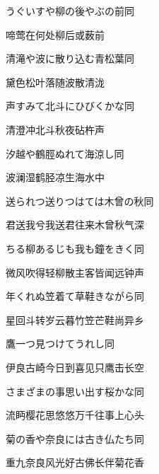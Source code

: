 \begin{haiku}
    {\FH うぐいすや柳の後やぶの前}\hfill{\FH 同}

    {\FK 啼莺在何处柳后或薮前}
\end{haiku}

\begin{haiku}
    {\FH 清滝や波に散り込む青松葉}\hfill{\FH 同}

    {\FK 黛色松叶落随波散清泷}
\end{haiku}

\begin{haiku}
    {\FH 声すみて北斗にひびくかな}\hfill{\FH 同}

    {\FK 清澄冲北斗秋夜砧杵声}
\end{haiku}

\begin{haiku}
    {\FH 汐越や鶴脛ぬれて海涼し}\hfill{\FH 同}

    {\FK 波澜湿鹤胫凉生海水中}
\end{haiku}

\begin{haiku}
    {\FH 送られつ送りつはては木曾の秋}\hfill{\FH 同}

    {\FK 君送我兮我送君往来木曾秋气深}
\end{haiku}

\begin{haiku}
    {\FH ちる柳あるじも我も鐘をきく}\hfill{\FH 同}

    {\FK 微风吹得轻柳散主客皆闻远钟声}
\end{haiku}

\begin{haiku}
    {\FH 年くれぬ笠着て草鞋きながら}\hfill{\FH 同}

    {\FK 星回斗转岁云暮竹笠芒鞋尚异乡}
\end{haiku}

\begin{haiku}
    {\FH 鷹一つ見つけてうれし}\hfill{\FH 同}

    {\FK 伊良古崎今日到喜见只鹰击长空}
\end{haiku}

\begin{haiku}
    {\FH さまざまの事思い出す桜かな}\hfill{\FH 同}

    {\FK 流眄樱花思悠悠万千往事上心头}
\end{haiku}

\begin{haiku}
    {\FH 菊の香や奈良には古き仏たち}\hfill{\FH 同}

    {\FK 重九奈良风光好古佛长伴菊花香}
\end{haiku}

